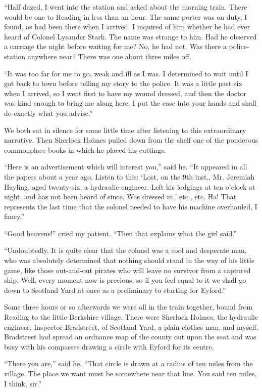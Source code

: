 \documentclass{article}
\begin{document}
``Half dazed, I went into the station and asked about the morning
train. There would be one to Reading in less than an hour. The same porter
was on duty, I found, as had been there when I arrived. I inquired of
him whether he had ever heard of Colonel Lysander Stark. The name was
strange to him. Had he observed a carriage the night before waiting for
me? No, he had not. Was there a police-station anywhere near? There was
one about three miles off.

``It was too far for me to go, weak and ill as I was. I determined to
wait until I got back to town before telling my story to the police. It
was a little past six when I arrived, so I went first to have my wound
dressed, and then the doctor was kind enough to bring me along here. I
put the case into your hands and shall do exactly what you advise.''

We both sat in silence for some little time after listening to this
extraordinary narrative. Then Sherlock Holmes pulled down from the shelf
one of the ponderous commonplace books in which he placed his cuttings.

``Here is an advertisement which will interest you,'' said he. ``It
appeared in all the papers about a year ago. Listen to this: `Lost,
on the 9th inst., Mr. Jeremiah Hayling, aged twenty-six, a hydraulic
engineer. Left his lodgings at ten o'clock at night, and has not been
heard of since. Was dressed in,' etc., etc. Ha! That represents the last
time that the colonel needed to have his machine overhauled, I fancy.''

``Good heavens!'' cried my patient. ``Then that explains what the
girl said.''

``Undoubtedly. It is quite clear that the colonel was a cool and desperate
man, who was absolutely determined that nothing should stand in the
way of his little game, like those out-and-out pirates who will leave
no survivor from a captured ship. Well, every moment now is precious,
so if you feel equal to it we shall go down to Scotland Yard at once as
a preliminary to starting for Eyford.''

Some three hours or so afterwards we were all in the train together,
bound from Reading to the little Berkshire village. There were Sherlock
Holmes, the hydraulic engineer, Inspector Bradstreet, of Scotland Yard,
a plain-clothes man, and myself. Bradstreet had spread an ordnance map
of the county out upon the seat and was busy with his compasses drawing
a circle with Eyford for its centre.

``There you are,'' said he. ``That circle is drawn at a radius of ten
miles from the village. The place we want must be somewhere near that
line. You said ten miles, I think, sir.''
\end{document}
